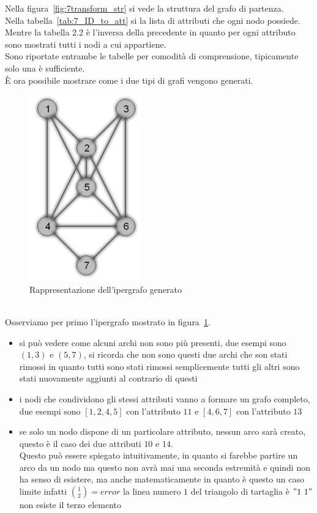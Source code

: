 %
%
\noindent Nella figura~\ref{fig:7transform_str} si vede la struttura del grafo di partenza.\\
Nella tabella~\ref{tab:7_ID_to_att} si la lista di attributi che ogni nodo possiede.\\
Mentre la tabella 2.2 %
è l'inversa della precedente in quanto per ogni attributo sono mostrati tutti i nodi a cui appartiene.\\
Sono riportate entrambe le tabelle per comodità di comprensione, tipicamente solo una è sufficiente.\\
È ora possibile mostrare come i due tipi di grafi vengono generati.
%
\begin{figure}[htp]
	\centering
	\includegraphics{immagini/7transform_hyper}
	\caption{Rappresentazione dell'ipergrafo generato}
	\label{fig:7transform_hyper}
\end{figure}
\\
Osserviamo per primo l'ipergrafo mostrato in figura~\ref{fig:7transform_hyper}.
\begin{itemize}
	\item  si può vedere come alcuni archi non sono più presenti, due esempi sono $(1,3)$ e $(5,7)$, si ricorda che non sono questi due archi che son stati rimossi in quanto tutti sono stati rimossi semplicemente tutti gli altri sono stati nuovamente aggiunti al contrario di questi
	\item  i nodi che condividono gli stessi attributi vanno a formare un grafo completo, due esempi sono $[1,2,4,5]$ con l'attributo $11$ e $[4,6,7]$ con l'attributo $13$
	\item  se solo un nodo dispone di un particolare attributo, nessun arco sarà creato, questo è il caso dei due attributi $10$ e $14$.\\
	Questo può essere spiegato intuitivamente, in quanto si farebbe partire un arco da un nodo ma questo non avrà mai una seconda estremità e quindi non ha senso di esistere, ma anche matematicamente in quanto è questo un caso limite infatti $ \displaystyle\binom{1}{2} = error$ la linea numero $1$ del triangolo di tartaglia è $"1\ 1"$ non esiste il terzo elemento
\end{itemize}
